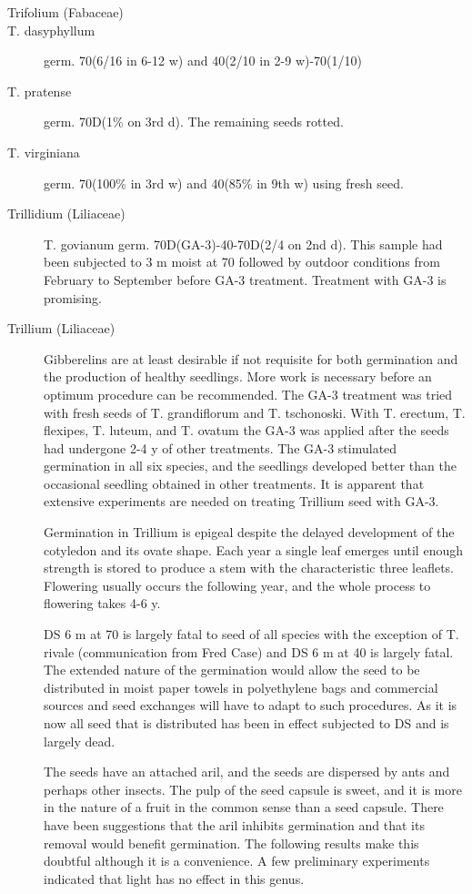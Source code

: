 \begin{description}
\item[Trifolium (Fabaceae)]
\item[T. dasyphyllum] germ. 70(6/16 in 6-12 w) and 40(2/10 in 2-9 w)-70(1/10)
\item[T. pratense] germ. 70D(1\% on 3rd d). The remaining seeds rotted.
\item[T. virginiana] germ. 70(100\% in 3rd w) and 40(85\% in 9th w) using fresh seed.
\item[Trillidium (Liliaceae)] T. govianum germ. 70D(GA-3)-40-70D(2/4 on 2nd d).
This sample had been subjected to 3 m moist at 70 followed by outdoor conditions
from February to September before GA-3 treatment. Treatment with GA-3 is promising.

\item[Trillium (Liliaceae)] Gibberelins are at least desirable if not requisite for
both germination and the production of healthy seedlings. More work is necessary
before an optimum procedure can be recommended. The GA-3 treatment was tried
with fresh seeds of T. grandiflorum and T. tschonoski. With T. erectum, T. flexipes, T.
luteum, and T. ovatum the GA-3 was applied after the seeds had undergone 2-4 y of
other treatments. The GA-3 stimulated germination in all six species, and the seedlings
developed better than the occasional seedling obtained in other treatments. It is
apparent that extensive experiments are needed on treating Trillium seed with GA-3.

Germination in Trillium is epigeal despite the delayed development of the
cotyledon and its ovate shape. Each year a single leaf emerges until enough strength
is stored to produce a stem with the characteristic three leaflets. Flowering usually
occurs the following year, and the whole process to flowering takes 4-6 y.

DS 6 m at 70 is largely fatal to seed of all species with the exception of T. rivale
(communication from Fred Case) and DS 6 m at 40 is largely fatal. The extended
nature of the germination would allow the seed to be distributed in moist paper towels
in polyethylene bags and commercial sources and seed exchanges will have to adapt
to such procedures. As it is now all seed that is distributed has been in effect
subjected to DS and is largely dead.

The seeds have an attached aril, and the seeds are dispersed by ants and
perhaps other insects. The pulp of the seed capsule is sweet, and it is more in the
nature of a fruit in the common sense than a seed capsule. There have been
suggestions that the aril inhibits germination and that its removal would benefit
germination. The following results make this doubtful although it is a convenience. A
few preliminary experiments indicated that light has no effect in this genus.


\end{description}
